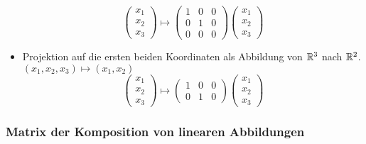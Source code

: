 \begin{bsp}
\begin{itemize}
\begin{equation*}
			\left( \begin{matrix}
			x_1 \\ 
			x_2 \\
			x_3
			\end{matrix} \right)
			\mapsto
			\left( \begin{matrix}
			1 & 0 & 0 \\ 
			0 & 1 & 0 \\
			0 & 0 & 0
			\end{matrix} \right)
			\left( \begin{matrix}
			x_1 \\ 
			x_2 \\
			x_3
			\end{matrix} \right)
		\end{equation*}
		\item Projektion auf die ersten beiden Koordinaten als Abbildung von $\mathbb R^3$ nach $\mathbb R^2$. $ (x_1,x_2,x_3) \mapsto (x_1,x_2) $
			\begin{equation*}
				\left( \begin{matrix}
				x_1 \\ 
				x_2 \\
				x_3
				\end{matrix} \right)
				\mapsto
				\left( \begin{matrix}
				1 & 0 & 0 \\ 
				0 & 1 & 0
				\end{matrix} \right)
				\left( \begin{matrix}
				x_1 \\ 
				x_2 \\
				x_3
				\end{matrix} \right)
			\end{equation*}
	\end{itemize}
\end{bsp}

\subsubsection{Matrix der Komposition von linearen Abbildungen}

